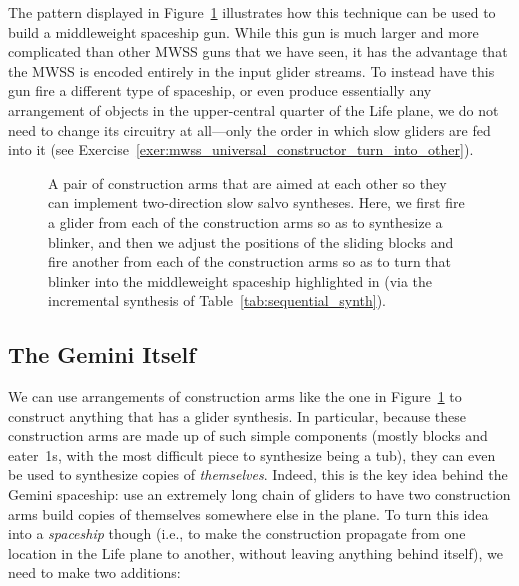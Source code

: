 The pattern displayed in Figure~\ref{fig:mwss_universal_constructor} illustrates how this technique can be used to build a middleweight spaceship gun. While this gun is much larger and more complicated than other MWSS guns that we have seen, it has the advantage that the MWSS is encoded entirely in the input glider streams. To instead have this gun fire a different type of spaceship, or even produce essentially any arrangement of objects in the upper-central quarter of the Life plane, we do not need to change its circuitry at all---only the order in which slow gliders are fed into it (see Exercise~\ref{exer:mwss_universal_constructor_turn_into_other}).

\begin{figure}[!htb]
	\centering
	\caption{A pair of construction arms that are aimed at each other so they can implement two-direction slow salvo syntheses. Here, we first fire a glider from each of the construction arms so as to synthesize a blinker, and then we adjust the positions of the sliding blocks and fire another from each of the construction arms so as to turn that blinker into the middleweight spaceship highlighted in  (via the incremental synthesis of Table~\ref{tab:sequential_synth}).}\label{fig:mwss_universal_constructor}
\end{figure}


\subsection{The Gemini Itself}\label{sec:gemini_itself}

We can use arrangements of construction arms like the one in Figure~\ref{fig:mwss_universal_constructor} to construct anything that has a glider synthesis. In particular, because these construction arms are made up of such simple components (mostly blocks and eater~1s, with the most difficult piece to synthesize being a tub), they can even be used to synthesize copies of \emph{themselves}. Indeed, this is the key idea behind the Gemini spaceship: use an extremely long chain of gliders to have two construction arms build copies of themselves somewhere else in the plane. To turn this idea into a \emph{spaceship} though (i.e., to make the construction propagate from one location in the Life plane to another, without leaving anything behind itself), we need to make two additions:\smallskip

